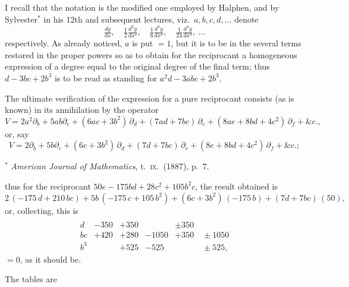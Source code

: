 \documentclass[11pt]{article}
\begin{document}
I recall that the notation is the modified one employed by Halphen, and by Sylvester$^*$ in his 12th and subsequent lectures, viz.\ $a, b, c, d, \ldots$ denote
\[
\tfrac{dy}{dx},\quad \tfrac{1}{2}\tfrac{d^2 y}{dx^2},\quad \tfrac{1}{6}\tfrac{d^3 y}{dx^3},\quad \tfrac{1}{24}\tfrac{d^4 y}{dx^4},\ \ldots
\]
respectively. As already noticed, $a$ is put $= 1$, but it is to be in the several terms restored in the proper powers so as to obtain for the reciprocant a homogeneous expression of a degree equal to the original degree of the final term; thus $d - 3bc + 2b^3$ is to be read as standing for $a^2 d - 3 a b c + 2 b^3$.

The ultimate verification of the expression for a pure reciprocant consists (as is known) in its annihilation by the operator
\[
V = 2a^2 \partial_b + 5ab\partial_c + (6ac + 3b^2)\,\partial_d + (7ad + 7bc)\,\partial_e + (8ae + 8bd + 4c^2)\,\partial_f + \&\mathrm{c.},
\]
or, say
\[
V = 2\partial_b + 5b\partial_c + (6c + 3b^2)\,\partial_d + (7d + 7bc)\,\partial_e + (8e + 8bd + 4c^2)\,\partial_f + \&\mathrm{c.};
\]

\noindent\footnotesize $^*$ \textit{American Journal of Mathematics}, t.\ \textsc{ix}.\ (1887), p.\ 7.\normalsize

thus for the reciprocant $50 e - 175 b d + 28 c^2 + 105 b^2 c$, the result obtained is
\[
2\,(-175\, d + 210\, b c) + 5 b\,(-175\, c + 105\, b^2) + (6 c + 3 b^2)\,(-175\, b) + (7 d + 7 b c)\,(50),
\]
or, collecting, this is
\[
\begin{array}{r|rrrr}
       &        &        &        &        \\[-6pt]
 d     & -350   & + 350  &        & \pm 350 \\
 bc    & + 420  & + 280  & -1050  & + 350\quad \pm 1050 \\
 b^3   &        & + 525  & - 525  & \phantom{+ 350\quad} \pm 525,
\end{array}
\]
$= 0$, as it should be.

The tables are
\end{document}

